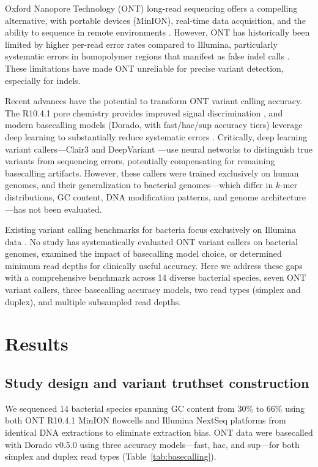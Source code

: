 \documentclass[11pt]{article}
\begin{document}
Oxford Nanopore Technology (ONT) long-read sequencing offers a compelling alternative, with portable devices (MinION), real-time data acquisition, and the ability to sequence in remote environments \citep{Jain2016,Wang2021}. However, ONT has historically been limited by higher per-read error rates compared to Illumina, particularly systematic errors in homopolymer regions that manifest as false indel calls \citep{Wick2019,Delahaye2021}. These limitations have made ONT unreliable for precise variant detection, especially for indels.

Recent advances have the potential to transform ONT variant calling accuracy. The R10.4.1 pore chemistry provides improved signal discrimination \citep{ONT2023}, and modern basecalling models (Dorado, with fast/hac/sup accuracy tiers) leverage deep learning to substantially reduce systematic errors \citep{Shafin2020}. Critically, deep learning variant callers---Clair3 \citep{Zheng2022} and DeepVariant \citep{Poplin2018}---use neural networks to distinguish true variants from sequencing errors, potentially compensating for remaining basecalling artifacts. However, these callers were trained exclusively on human genomes, and their generalization to bacterial genomes---which differ in $k$-mer distributions, GC content, DNA modification patterns, and genome architecture---has not been evaluated.

Existing variant calling benchmarks for bacteria focus exclusively on Illumina data \citep{Bush2020,Olson2015}. No study has systematically evaluated ONT variant callers on bacterial genomes, examined the impact of basecalling model choice, or determined minimum read depths for clinically useful accuracy. Here we address these gaps with a comprehensive benchmark across 14 diverse bacterial species, seven ONT variant callers, three basecalling accuracy models, two read types (simplex and duplex), and multiple subsampled read depths.

\section{Results}

\subsection{Study design and variant truthset construction}

We sequenced 14 bacterial species spanning GC content from 30\% to 66\% using both ONT R10.4.1 MinION flowcells and Illumina NextSeq platforms from identical DNA extractions to eliminate extraction bias. ONT data were basecalled with Dorado v0.5.0 using three accuracy models---fast, hac, and sup---for both simplex and duplex read types (Table~\ref{tab:basecalling}).
\end{document}

